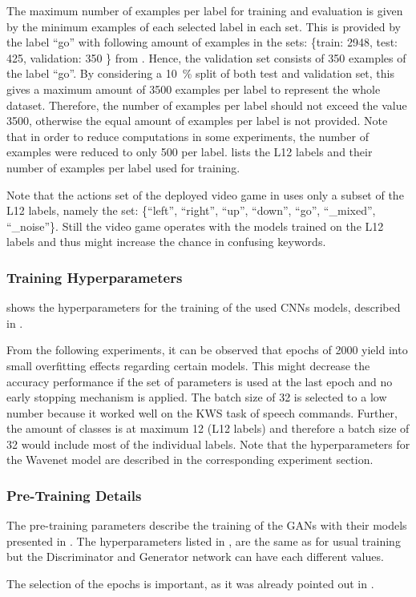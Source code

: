 The maximum number of examples per label for training and evaluation is given by the minimum examples of each selected label in each set.
This is provided by the label \enquote{go} with following amount of examples in the sets: \{train: 2948, test: 425, validation: 350 \} from .
Hence, the validation set consists of 350 examples of the label \enquote{go}.
By considering a \SI{10}{\percent} split of both test and validation set, this gives a maximum amount of 3500 examples per label to represent the whole dataset.
Therefore, the number of examples per label should not exceed the value 3500, otherwise the equal amount of examples per label is not provided.
Note that in order to reduce computations in some experiments, the number of examples were reduced to only 500 per label.
 lists the L12 labels and their number of examples per label used for training.

Note that the actions set of the deployed video game in  uses only a subset of the L12 labels, namely the set: \{\enquote{left},  \enquote{right}, \enquote{up}, \enquote{down}, \enquote{go}, \enquote{\_mixed}, \enquote{\_noise}\}.
Still the video game operates with the models trained on the L12 labels and thus might increase the chance in confusing keywords.



\subsubsection{Training Hyperparameters}
 shows the hyperparameters for the training of the used CNNs models, described in .

From the following experiments, it can be observed that epochs of 2000 yield into small overfitting effects regarding certain models.
This might decrease the accuracy performance if the set of parameters is used at the last epoch and no early stopping mechanism is applied.
The batch size of 32 is selected to a low number because it worked well on the KWS task of speech commands.
Further, the amount of classes is at maximum 12 (L12 labels) and therefore a batch size of 32 would include most of the individual labels.
Note that the hyperparameters for the Wavenet model are described in the corresponding experiment section.



\subsubsection{Pre-Training Details}
The pre-training parameters describe the training of the GANs with their models presented in .
The hyperparameters listed in , are the same as for usual training but the Discriminator and Generator network can have each different values.

The selection of the epochs is important, as it was already pointed out in .


